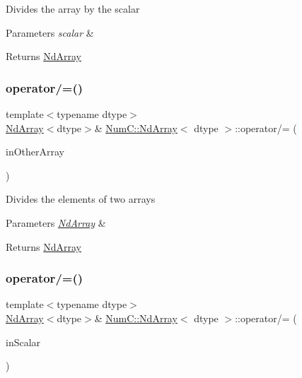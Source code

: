 Divides the array by the scalar


\begin{DoxyParams}{Parameters}
{\em scalar} & \\
\hline
\end{DoxyParams}
\begin{DoxyReturn}{Returns}
\mbox{\hyperlink{class_num_c_1_1_nd_array}{Nd\+Array}} 
\end{DoxyReturn}
\mbox{\label{class_num_c_1_1_nd_array_af9950420762002d301c396e1d5ab0858}} 
\subsubsection{\texorpdfstring{operator/=()}{operator/=()}\hspace{0.1cm}{\footnotesize\ttfamily [1/2]}}
{\footnotesize\ttfamily template$<$typename dtype$>$ \\
\mbox{\hyperlink{class_num_c_1_1_nd_array}{Nd\+Array}}$<$dtype$>$\& \mbox{\hyperlink{class_num_c_1_1_nd_array}{Num\+C\+::\+Nd\+Array}}$<$ dtype $>$\+::operator/= (\begin{DoxyParamCaption}\item[{const \mbox{\hyperlink{class_num_c_1_1_nd_array}{Nd\+Array}}$<$ dtype $>$ \&}]{in\+Other\+Array }\end{DoxyParamCaption})\hspace{0.3cm}{\ttfamily [inline]}}

Divides the elements of two arrays


\begin{DoxyParams}{Parameters}
{\em \mbox{\hyperlink{class_num_c_1_1_nd_array}{Nd\+Array}}} & \\
\hline
\end{DoxyParams}
\begin{DoxyReturn}{Returns}
\mbox{\hyperlink{class_num_c_1_1_nd_array}{Nd\+Array}} 
\end{DoxyReturn}
\mbox{\label{class_num_c_1_1_nd_array_a367f7ca671c2c35bda980bb7fff8adf2}} 
\subsubsection{\texorpdfstring{operator/=()}{operator/=()}\hspace{0.1cm}{\footnotesize\ttfamily [2/2]}}
{\footnotesize\ttfamily template$<$typename dtype$>$ \\
\mbox{\hyperlink{class_num_c_1_1_nd_array}{Nd\+Array}}$<$dtype$>$\& \mbox{\hyperlink{class_num_c_1_1_nd_array}{Num\+C\+::\+Nd\+Array}}$<$ dtype $>$\+::operator/= (\begin{DoxyParamCaption}\item[{dtype}]{in\+Scalar }\end{DoxyParamCaption})\hspace{0.3cm}{\ttfamily [inline]}}

